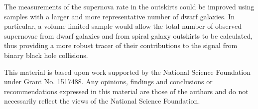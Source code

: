 \documentclass[apj]{emulateapj}
\begin{document}
The measurements of the supernova rate in the outskirts could be improved using samples with a larger and more representative number of dwarf galaxies. In particular, a volume-limited sample would allow the total number of observed supernovae from dwarf galaxies and from spiral galaxy outskirts to be calculated, thus providing a more robust tracer of their contributions to the signal from binary black hole collisions.

This material is based upon work supported by the National Science Foundation under Grant No. 1517488. Any opinions, findings and conclusions or recommendations expressed in this material are those of the authors and do not necessarily reflect the views of the National Science Foundation.



\end{document}
